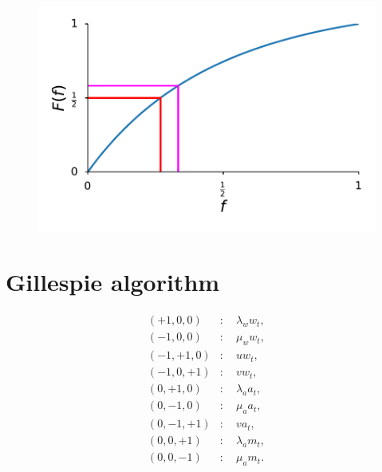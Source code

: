 \documentclass[11pt,a4paper]{article}
\begin{document}
\begin{figure}[!t]
 \vspace*{1\baselineskip}
\includegraphics[width=1\textwidth]{FractionPlot.pdf}
\caption{}
\label{FractionPlot}
\end{figure}




\appendix

\section{Gillespie algorithm}
\begin{subequations}
\begin{flalign}
(+1,0,0)&:\quad \lambda_ww_t,\\
(-1,0,0)&:\quad \mu_ww_t,\\
(-1,+1,0)&:\quad uw_t,\\
(-1,0,+1)&:\quad vw_t,\\
(0,+1,0)&:\quad \lambda_aa_t,\\
(0,-1,0)&:\quad \mu_aa_t,\\
(0,-1,+1)&:\quad va_t,\\
(0,0,+1)&:\quad \lambda_am_t,\\
(0,0,-1)&:\quad \mu_am_t.
\end{flalign}
\end{subequations}
\end{document}
